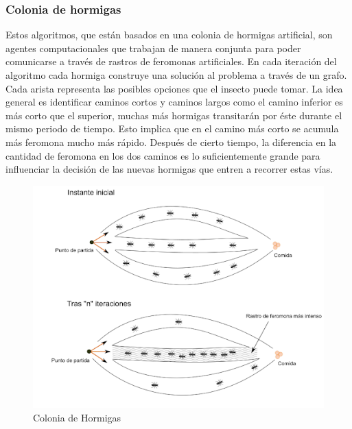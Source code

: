 \documentclass[a4paper,twocolumn,10pt]{article}
\begin{document}
\subsubsection*{Colonia de hormigas}

Estos algoritmos, que están basados en una colonia de hormigas artificial, son agentes computacionales que trabajan de manera conjunta para poder comunicarse a través de rastros de feromonas artificiales. En cada iteración del algoritmo cada hormiga construye una solución al problema a través de un grafo. Cada arista representa las posibles opciones que el
insecto puede tomar.
La idea general es identificar caminos cortos y caminos largos como el camino inferior es más corto que el superior, muchas más hormigas transitarán por éste durante el mismo periodo de tiempo. Esto implica que en el camino más corto se acumula más feromona mucho más rápido.
Después de cierto tiempo, la diferencia en la cantidad de feromona en los dos caminos es lo suficientemente grande para influenciar la decisión de las nuevas hormigas que entren a recorrer estas vías.
\begin{figure}[h]
    \centering
    \includegraphics[scale=0.45]{hormigas.png}
    \caption{Colonia de Hormigas}
    \label{fig:mesh1}
\end{figure}
\end{document}
